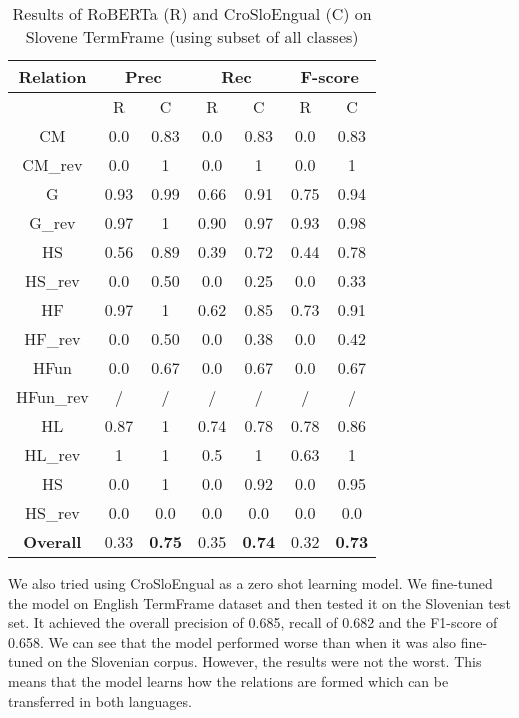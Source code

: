 \documentclass[fleqn,moreauthors,10pt]{ds_report}
\begin{document}
\begin{table}[!ht]
    \centering
    \begin{tabular}{|c|c | c|c | c|c | c|}
        \hline
        \textbf{Relation} & \multicolumn{2}{|c|}{\textbf{Prec}} & \multicolumn{2}{|c|}{\textbf{Rec}} & \multicolumn{2}{|c|}{\textbf{F-score}} \\ \hline \hline
        &  R & C &  R  & C &  R & C\\ \hline
        CM \footnotemark[1]  & 0.0 & 0.83 & 0.0 & 0.83 & 0.0 & 0.83 \\ \hline
        CM\_rev \footnotemark[2]  & 0.0  & 1 & 0.0 & 1 & 0.0 & 1 \\ \hline
        G               & 0.93  & 0.99 & 0.66  & 0.91 & 0.75 &  0.94\\ \hline
        G\_rev               & 0.97 & 1 & 0.90  & 0.97 & 0.93 &  0.98\\ \hline
        HS           &  0.56 & 0.89 &  0.39 &  0.72 &  0.44 & 0.78\\ \hline
        HS\_rev           &  0.0 & 0.50 &  0.0 &  0.25 &  0.0 & 0.33\\ \hline
        HF           &  0.97 & 1 &  0.62 & 0.85 &  0.73 & 0.91 \\ \hline
        HF\_rev           &  0.0 & 0.50 &  0.0 & 0.38 &  0.0 & 0.42 \\ \hline
        HFun       & 0.0  & 0.67 &  0.0 & 0.67 &  0.0 & 0.67 \\ \hline
        HFun\_rev        & /  & / &  / & / &  / & / \\ \hline
        HL        &  0.87  & 1 & 0.74 & 0.78 &  0.78 & 0.86 \\ \hline
        HL\_rev        &  1  & 1 & 0.5 & 1 &  0.63 & 1 \\ \hline
        HS            & 0.0 & 1 & 0.0  & 0.92 & 0.0 & 0.95\\ \hline
        HS\_rev            & 0.0 & 0.0 & 0.0  & 0.0 & 0.0 & 0.0\\ \hline \hline
        \textbf{Overall} & 0.33 & \textbf{0.75} & 0.35 & \textbf{0.74} & 0.32 & \textbf{0.73}\\ \hline
    \end{tabular}
    \caption{Results of RoBERTa (R) and CroSloEngual (C) on Slovene TermFrame (using subset of all classes)}
    \label{tab:karst_subset2_en_sl}
\end{table}


We also tried using CroSloEngual as a zero shot learning model. We fine-tuned the model on English TermFrame dataset and then tested it on the Slovenian test set. It achieved the overall precision of 0.685, recall of 0.682 and the F1-score of 0.658. We can see that the model performed worse than when it was also fine-tuned on the Slovenian corpus. However, the results were not the worst. This means that the model learns how the relations are formed which can be transferred in both languages.
\end{document}
